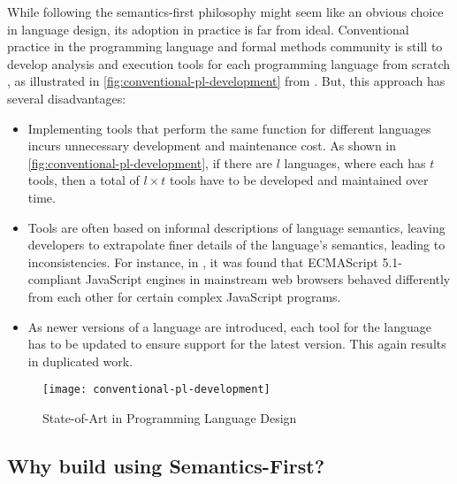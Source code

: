 While following the semantics-first philosophy might seem like an obvious choice
in language design, its adoption in practice is far from ideal.
Conventional practice in the programming language and formal
methods community is still to develop analysis and execution tools for each
programming language from scratch \cite{ChenSETSS19}, as illustrated
in \autoref{fig:conventional-pl-development} from
\cite{ChenSETSS19}. But, this approach has several
disadvantages:
\begin{itemize}
  \item Implementing tools that perform the same function for
    different languages incurs unnecessary development and maintenance cost.
    As shown in \autoref{fig:conventional-pl-development}, if there are
    $l$ languages, where each has $t$ tools, then a total of $l \times t$
    tools have to be developed and maintained over time.
  \item Tools are often based on informal descriptions of language semantics,
    leaving developers to extrapolate finer details of the language's semantics,
    leading to inconsistencies.
    For instance, in \cite{ParkPLDI15}, it was found
    that ECMAScript 5.1-compliant JavaScript engines
    in mainstream web browsers behaved differently from each other
    for certain complex JavaScript programs.
  \item As newer versions of a language are introduced, each
    tool for the language has to be updated to ensure support for the latest
    version. This again results in duplicated work.
\end{itemize}
\begin{figure}[t!]
  \centering
  \texttt{[image: conventional-pl-development]}
  \caption{State-of-Art in Programming Language Design}\label{fig:conventional-pl-development}
\end{figure}

\subsection{Why build \CDSSs{} using Semantics-First?}\label{sec:why-use-semantics-first}

